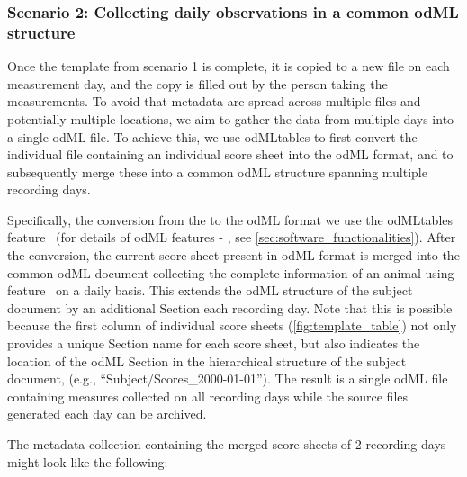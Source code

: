 {\subsubsection*{Scenario 2: Collecting daily observations in a common odML structure}

Once the template from scenario 1 is complete, it is copied to a new file on each measurement day, and the copy is filled out by the person taking the measurements. To avoid that metadata are spread across multiple files and potentially multiple locations, we aim to gather the data from multiple days into a single odML file. To achieve this, we use odMLtables to first convert the individual  file containing an individual score sheet into the odML format, and to subsequently merge these into a common odML structure spanning multiple recording days.

Specifically, the conversion from the  to the odML format we use the odMLtables feature \fconvert\ (for details of odML features \fconvert - \ffilter, see \cref{sec:software_functionalities}). After the conversion, the current score sheet present in odML format is merged into the common odML document collecting the complete information of an animal using feature \fmerge \ on a daily basis. This extends the odML structure of the subject document by an additional Section each recording day. Note that this is possible because the first column of individual score sheets (\cref{fig:template_table}) not only provides a unique Section name for each score sheet, but also indicates the location of the odML Section in the hierarchical structure of the subject document, (e.g., ``Subject/Scores\_2000-01-01''). The result is a single odML file containing measures collected on all recording days while the source files generated each day can be archived.

The metadata collection containing the merged score sheets of 2 recording days might look like the following:

\begin{minipage}[t]{\textwidth}
\ \\
\end{minipage}

}
